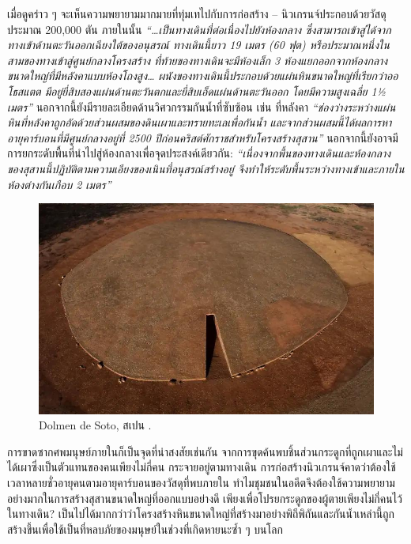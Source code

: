 \documentclass[10pt,twocolumn,letterpaper]{article}
\begin{document}
เมื่อดูคร่าว ๆ จะเห็นความพยายามมากมายที่ทุ่มเทไปกับการก่อสร้าง – นิวเกรนจ์ประกอบด้วยวัสดุประมาณ 200,000 ตัน ภายในนั้น \textit{“…เป็นทางเดินที่ต่อเนื่องไปยังห้องกลาง ซึ่งสามารถเข้าสู่ได้จากทางเข้าด้านตะวันออกเฉียงใต้ของอนุสรณ์ ทางเดินนี้ยาว 19 เมตร (60 ฟุต) หรือประมาณหนึ่งในสามของทางเข้าสู่ศูนย์กลางโครงสร้าง ที่ท้ายของทางเดินจะมีห้องเล็ก 3 ห้องแยกออกจากห้องกลางขนาดใหญ่ที่มีหลังคาแบบห้องโถงสูง… ผนังของทางเดินนี้ประกอบด้วยแผ่นหินขนาดใหญ่ที่เรียกว่าออโธสแตต มีอยู่ยี่สิบสองแผ่นด้านตะวันตกและยี่สิบเอ็ดแผ่นด้านตะวันออก โดยมีความสูงเฉลี่ย 1½ เมตร”} \cite{70} นอกจากนี้ยังมีรายละเอียดด้านวิศวกรรมกันน้ำที่ซับซ้อน เช่น ที่หลังคา \textit{“ช่องว่างระหว่างแผ่นหินที่หลังคาถูกอัดด้วยส่วนผสมของดินเผาและทรายทะเลเพื่อกันน้ำ และจากส่วนผสมนี้ได้ผลการหาอายุคาร์บอนที่มีศูนย์กลางอยู่ที่ 2500 ปีก่อนคริสต์ศักราชสำหรับโครงสร้างสุสาน”} \cite{71} นอกจากนี้ยังอาจมีการยกระดับพื้นที่นำไปสู่ห้องกลางเพื่อจุดประสงค์เดียวกัน: \textit{“เนื่องจากพื้นของทางเดินและห้องกลางของสุสานนี้ปฏิบัติตามความเอียงของเนินที่อนุสรณ์สร้างอยู่ จึงทำให้ระดับพื้นระหว่างทางเข้าและภายในห้องต่างกันเกือบ 2 เมตร”} \cite{71}

\begin{figure}[b]

\begin{center}
   \includegraphics[width=1\linewidth]{dolmen.jpg}
\end{center}
   \caption{Dolmen de Soto, สเปน \cite{53}.}
\label{fig:9}
\label{fig:onecol}
\end{figure}

การขาดซากศพมนุษย์ภายในก็เป็นจุดที่น่าสงสัยเช่นกัน จากการขุดค้นพบชิ้นส่วนกระดูกที่ถูกเผาและไม่ได้เผาซึ่งเป็นตัวแทนของคนเพียงไม่กี่คน กระจายอยู่ตามทางเดิน การก่อสร้างนิวเกรนจ์คาดว่าต้องใช้เวลาหลายชั่วอายุคนตามอายุคาร์บอนของวัสดุที่พบภายใน ทำไมชุมชนในอดีตจึงต้องใช้ความพยายามอย่างมากในการสร้างสุสานขนาดใหญ่ที่ออกแบบอย่างดี เพียงเพื่อโปรยกระดูกของผู้ตายเพียงไม่กี่คนไว้ในทางเดิน? เป็นไปได้มากกว่าว่าโครงสร้างหินขนาดใหญ่ที่สร้างมาอย่างพิถีพิถันและกันน้ำเหล่านี้ถูกสร้างขึ้นเพื่อใช้เป็นที่หลบภัยของมนุษย์ในช่วงที่เกิดหายนะซ้ำ ๆ บนโลก
\end{document}
